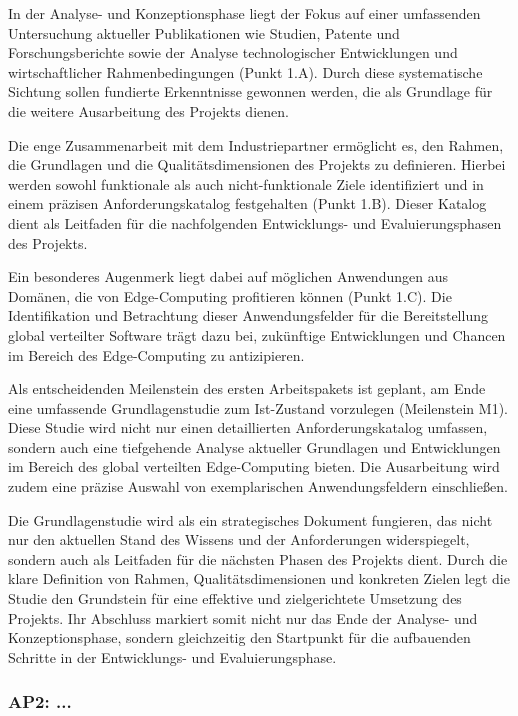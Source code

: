 In der Analyse- und Konzeptionsphase liegt der Fokus auf einer umfassenden Untersuchung aktueller Publikationen wie Studien, Patente und Forschungsberichte sowie der Analyse technologischer Entwicklungen und wirtschaftlicher Rahmenbedingungen (Punkt 1.A).
Durch diese systematische Sichtung sollen fundierte Erkenntnisse gewonnen werden, die als Grundlage für die weitere Ausarbeitung des Projekts dienen.

Die enge Zusammenarbeit mit dem Industriepartner ermöglicht es, den Rahmen, die Grundlagen und die Qualitätsdimensionen des Projekts zu definieren.
Hierbei werden sowohl funktionale als auch nicht-funktionale Ziele identifiziert und in einem präzisen Anforderungskatalog festgehalten (Punkt 1.B).
Dieser Katalog dient als Leitfaden für die nachfolgenden Entwicklungs- und Evaluierungsphasen des Projekts.

Ein besonderes Augenmerk liegt dabei auf möglichen Anwendungen aus Domänen, die von Edge-Computing profitieren können (Punkt 1.C).
Die Identifikation und Betrachtung dieser Anwendungsfelder für die Bereitstellung global verteilter Software trägt dazu bei, zukünftige Entwicklungen und Chancen im Bereich des Edge-Computing zu antizipieren.

Als entscheidenden Meilenstein des ersten Arbeitspakets ist geplant, am Ende eine umfassende Grundlagenstudie zum Ist-Zustand vorzulegen (Meilenstein M1).
Diese Studie wird nicht nur einen detaillierten Anforderungskatalog umfassen, sondern auch eine tiefgehende Analyse aktueller Grundlagen und Entwicklungen im Bereich des global verteilten Edge-Computing bieten.
Die Ausarbeitung wird zudem eine präzise Auswahl von exemplarischen Anwendungsfeldern einschließen.

Die Grundlagenstudie wird als ein strategisches Dokument fungieren, das nicht nur den aktuellen Stand des Wissens und der Anforderungen widerspiegelt, sondern auch als Leitfaden für die nächsten Phasen des Projekts dient.
Durch die klare Definition von Rahmen, Qualitätsdimensionen und konkreten Zielen legt die Studie den Grundstein für eine effektive und zielgerichtete Umsetzung des Projekts.
Ihr Abschluss markiert somit nicht nur das Ende der Analyse- und Konzeptionsphase, sondern gleichzeitig den Startpunkt für die aufbauenden Schritte in der Entwicklungs- und Evaluierungsphase.

\subsubsection{AP2: ...}
\label{subsec:ap:2}

